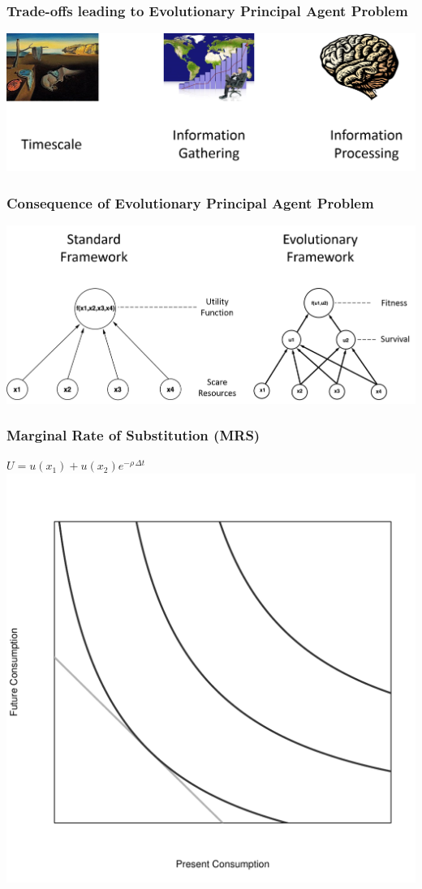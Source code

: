 \documentclass{beamer}
\begin{document}
\begin{frame}
  \frametitle{Trade-offs leading to Evolutionary Principal Agent Problem}
  \begin{center}
    \includegraphics[width=1\textwidth]{why_PaP.png}
  \end{center}
\end{frame}

\begin{frame}
  \frametitle{Consequence of Evolutionary Principal Agent Problem}
  \begin{center}
    \includegraphics[width=1\textwidth]{framework.png}
  \end{center}
\end{frame}

\begin{frame}
  \frametitle{Marginal Rate of Substitution (MRS)}
  \begin{center}
  $U = u(x_1) + u(x_2) e^{-\rho \, \Delta t}$
  \vspace{.5cm}
  \pause
    \includegraphics[width=.7\textwidth]{fisher_indifference.pdf}\
  \end{center}
\end{frame}
\end{document}
